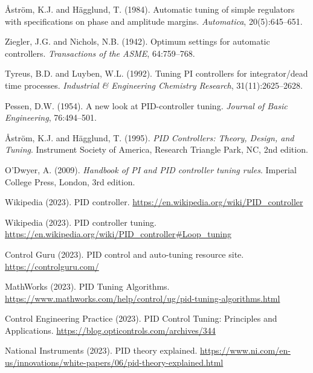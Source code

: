\documentclass[a4paper,11pt]{article}
\begin{document}
\begin{thebibliography}{99}

Åström, K.J. and Hägglund, T. (1984).
\newblock Automatic tuning of simple regulators with specifications on phase and amplitude margins.
\newblock \emph{Automatica}, 20(5):645--651.

Ziegler, J.G. and Nichols, N.B. (1942).
\newblock Optimum settings for automatic controllers.
\newblock \emph{Transactions of the ASME}, 64:759--768.

Tyreus, B.D. and Luyben, W.L. (1992).
\newblock Tuning PI controllers for integrator/dead time processes.
\newblock \emph{Industrial \& Engineering Chemistry Research}, 31(11):2625--2628.

Pessen, D.W. (1954).
\newblock A new look at PID-controller tuning.
\newblock \emph{Journal of Basic Engineering}, 76:494--501.

Åström, K.J. and Hägglund, T. (1995).
\newblock \emph{PID Controllers: Theory, Design, and Tuning}.
\newblock Instrument Society of America, Research Triangle Park, NC, 2nd edition.

O'Dwyer, A. (2009).
\newblock \emph{Handbook of PI and PID controller tuning rules}.
\newblock Imperial College Press, London, 3rd edition.

Wikipedia (2023).
\newblock PID controller.
\newblock \url{https://en.wikipedia.org/wiki/PID_controller}

Wikipedia (2023).
\newblock PID controller tuning.
\newblock \url{https://en.wikipedia.org/wiki/PID_controller#Loop_tuning}

Control Guru (2023).
\newblock PID control and auto-tuning resource site.
\newblock \url{https://controlguru.com/}

MathWorks (2023).
\newblock PID Tuning Algorithms.
\newblock \url{https://www.mathworks.com/help/control/ug/pid-tuning-algorithms.html}

Control Engineering Practice (2023).
\newblock PID Control Tuning: Principles and Applications.
\newblock \url{https://blog.opticontrols.com/archives/344}

National Instruments (2023).
\newblock PID theory explained.
\newblock \url{https://www.ni.com/en-us/innovations/white-papers/06/pid-theory-explained.html}

\end{thebibliography}
\end{document}
